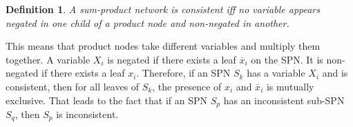 \documentclass[a4paper,10pt]{article}
\theoremstyle{plain}
\newtheorem*{spn-def}{Definition}
\begin{document}
\begin{figure}[h]
\end{figure}

\begin{spn-def}
  A sum-product network is consistent iff no variable appears negated in one child of a product
  node and non-negated in another.
\end{spn-def}

This means that product nodes take different variables and multiply them together. A variable $X_i$
is negated if there exists a leaf $\overline{x}_i$ on the SPN\@. It is non-negated if there exists
a leaf $x_i$. Therefore, if an SPN $S_k$ has a variable $X_i$ and is consistent, then for all
leaves of $S_k$, the presence of $x_i$ and $\overline{x}_i$ is mutually exclusive. That leads to
the fact that if an SPN $S_p$ has an inconsistent sub-SPN $S_q$, then $S_p$ is inconsistent.

\begin{figure}[h]
\end{figure}
\end{document}
